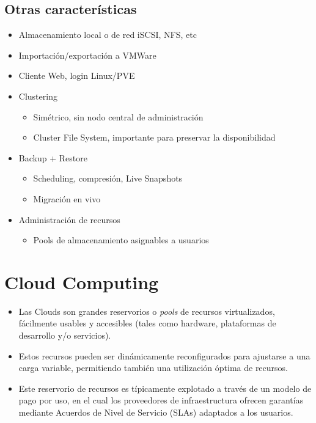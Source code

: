 \subsection{Otras características}
	\begin{itemize}
		\item Almacenamiento local o de red iSCSI, NFS, etc
		\item Importación/exportación a VMWare
		\item Cliente Web, login Linux/PVE
		\item Clustering
		\begin{itemize}
 			\item Simétrico, sin nodo central de administración 
			\item Cluster File System, importante para preservar la disponibilidad
	 	\end{itemize}		
 		\item Backup + Restore
		\begin{itemize}
		 	\item Scheduling, compresión, Live Snapshots
			\item Migración en vivo
		 \end{itemize}
		\item Administración de recursos
	\begin{itemize}
 		\item Pools de almacenamiento asignables a usuarios
 	\end{itemize}
\end{itemize}


\section{Cloud Computing}
\begin{itemize}
	\item Las Clouds son grandes reservorios o \textit{pools} de recursos virtualizados, fácilmente usables y accesibles (tales como hardware, plataformas de desarrollo y/o servicios). 
	\item Estos recursos pueden ser dinámicamente reconfigurados para ajustarse a una carga variable, permitiendo también una utilización óptima de recursos. 
	\item Este reservorio de recursos es típicamente explotado a través de un modelo de pago por uso, en el cual los proveedores de infraestructura ofrecen garantías mediante Acuerdos de Nivel de Servicio (SLAs) adaptados a los usuarios. 
\end{itemize}


